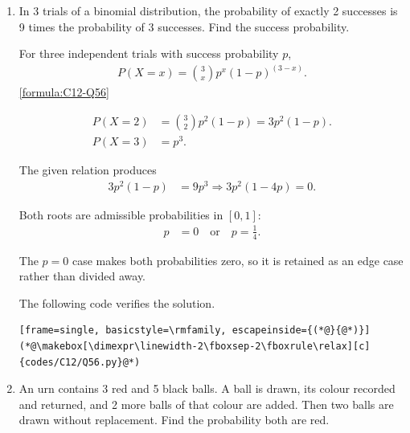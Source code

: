 \begin{enumerate}[label=\thesubsection.\arabic*, ref=\thesubsection.\theenumi]
    \item
    \label{question:C12-Q56}
    \label{question-short:C12-Q56} In 3 trials of a binomial distribution, the probability of exactly 2 successes is 9 times the probability of 3 successes. Find the success probability.

    \par
    \smallskip
    \solution

    For three independent trials with success probability $p$,
    \begin{align*}
	     P(X=x)=\binom3xp^x(1-p)^{(3-x)}.
    \end{align*}
    \hfill\eqref{formula:C12-Q56}

    \par
    
    \begin{align*}
        P(X=2) & =\binom32p^2(1-p)=3p^2(1-p). \\
        P(X=3) & =p^3.
    \end{align*}

    The given relation produces
    \begin{align*}
        3p^2(1-p) & =9p^3
        \Longrightarrow 3p^2(1-4p)=0.
    \end{align*}

    Both roots are admissible probabilities in $[0,1]$:
    \begin{align*}
        p & =0\quad\text{or}\quad p=\frac14.
    \end{align*}

    The $p=0$ case makes both probabilities zero, so it is retained as an edge case rather than divided away.

    The following code verifies the solution.

    \begin{lstlisting}[frame=single, basicstyle=\rmfamily, escapeinside={(*@}{@*)}]
(*@\makebox[\dimexpr\linewidth-2\fboxsep-2\fboxrule\relax][c]{codes/C12/Q56.py}@*)
    \end{lstlisting}


    \item
    \label{question:C12-Q57}
    \label{question-short:C12-Q57} An urn contains 3 red and 5 black balls. A ball is drawn, its colour recorded and returned, and 2 more balls of that colour are added. Then two balls are drawn without replacement. Find the probability both are red.

    \par
    \smallskip
    \solution


\end{enumerate}
